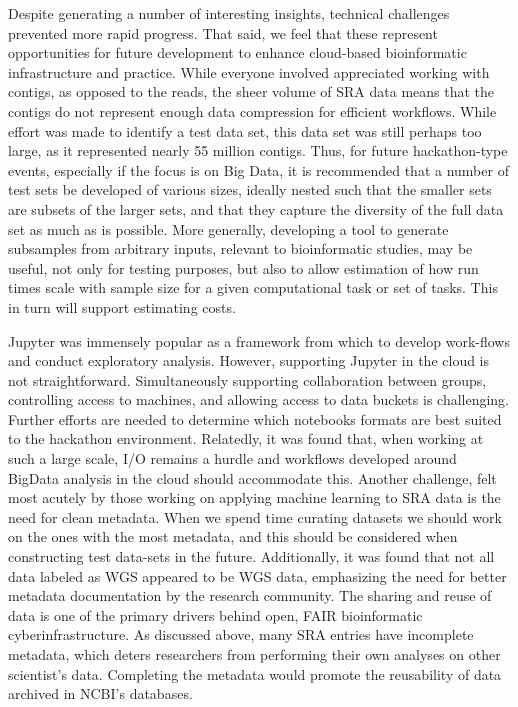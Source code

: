 \documentclass[genes, moreauthors]{Definitions/mdpi}
\begin{document}
Despite generating a number of interesting insights, technical challenges
prevented more rapid progress. That said, we feel that these represent
opportunities for future development to enhance cloud-based bioinformatic
infrastructure and practice. While everyone involved appreciated working with
contigs, as opposed to the reads, the sheer volume of SRA data means that the
contigs do not represent enough data compression for efficient workflows. While
effort was made to identify a test data set, this data set was still perhaps
too large, as it represented nearly 55 million contigs. Thus, for future
hackathon-type events, especially if the focus is on Big Data, it is
recommended that a number of test sets be developed of various sizes, ideally
nested such that the smaller sets are subsets of the larger sets, and that they
capture the diversity of the full data set as much as is possible. More
generally, developing a tool to generate subsamples from arbitrary inputs,
relevant to bioinformatic studies, may be useful, not only for testing
purposes, but also to allow estimation of how run times scale with sample size
for a given computational task or set of tasks. This in turn will support
estimating costs.

Jupyter was immensely popular as a framework from which to develop work-flows
and conduct exploratory analysis. However, supporting Jupyter in the cloud is
not straightforward. Simultaneously supporting collaboration between groups,
controlling access to machines, and allowing access to data buckets is
challenging. Further efforts are needed to determine which notebooks formats
are best suited to the hackathon environment. Relatedly, it was found that,
when working at such a large scale, I/O remains a hurdle and workflows
developed around BigData analysis in the cloud should accommodate this. Another
challenge, felt most acutely by those working on applying machine learning to
SRA data is the need for clean metadata. When we spend time curating datasets
we should work on the ones with the most metadata, and this should be
considered when constructing test data-sets in the future. Additionally, it was
found that not all data labeled as WGS appeared to be WGS data, emphasizing the
need for better metadata documentation by the research community. The sharing
and reuse of data is one of the primary drivers behind open, FAIR bioinformatic
cyberinfrastructure. As discussed above, many SRA entries have incomplete
metadata, which deters researchers from performing their own analyses on other
scientist’s data. Completing the metadata would promote the reusability of data
archived in NCBI’s databases.
\end{document}

